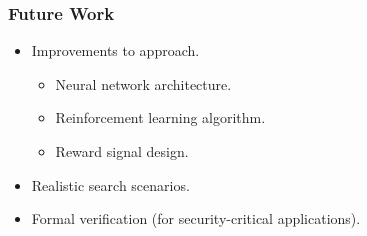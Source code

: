 \begin{frame}
    \frametitle{Future Work}

    \begin{itemize}
        \item Improvements to approach.
        \begin{itemize}
            \item Neural network architecture.
            \item Reinforcement learning algorithm.
            \item Reward signal design.
        \end{itemize}
        \item Realistic search scenarios.
        \item Formal verification (for security-critical applications).
    \end{itemize}
\end{frame}